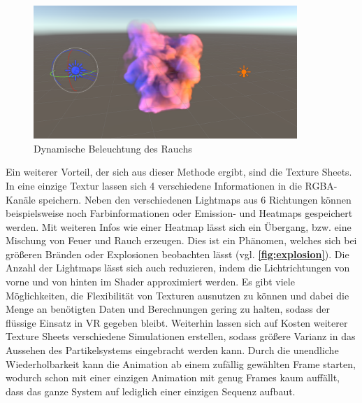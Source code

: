 \begin{figure}[h!]
	\centering
	\includegraphics[width=0.89\textwidth]{Grafiken/Implementation/litSmoke.png}
	\begin{footnotesize}
		\caption{Dynamische Beleuchtung des Rauchs}
		\label{fig:dynamicLightingSmoke}
	\end{footnotesize}
\end{figure}


Ein weiterer Vorteil, der sich aus dieser Methode ergibt, sind die Texture Sheets. In eine einzige Textur lassen sich 4 verschiedene Informationen in die
RGBA-Kanäle speichern. Neben den verschiedenen Lightmaps aus 6 Richtungen können beispielsweise noch Farbinformationen oder Emission- und Heatmaps gespeichert werden.
Mit weiteren Infos wie einer Heatmap lässt sich ein Übergang, bzw. eine Mischung von Feuer und Rauch erzeugen. Dies ist ein Phänomen, welches sich bei größeren Bränden
oder Explosionen beobachten lässt (vgl. \textbf{\autoref{fig:explosion}}).
Die Anzahl der Lightmaps lässt sich auch reduzieren, indem die Lichtrichtungen von vorne und von hinten im Shader approximiert werden.
Es gibt viele Möglichkeiten, die Flexibilität von Texturen ausnutzen zu können und dabei die Menge an benötigten Daten und Berechnungen gering zu halten,
sodass der flüssige Einsatz in VR gegeben bleibt. Weiterhin lassen sich auf Kosten weiterer Texture Sheets
verschiedene Simulationen erstellen, sodass größere Varianz in das Aussehen des Partikelsystems eingebracht werden kann.
Durch die unendliche Wiederholbarkeit kann die Animation ab einem zufällig gewählten Frame starten, wodurch schon mit einer einzigen Animation mit genug Frames
kaum auffällt, dass das ganze System auf lediglich einer einzigen Sequenz aufbaut.


